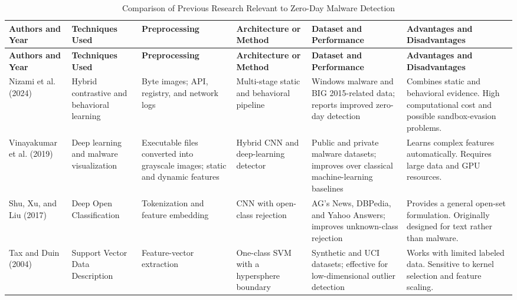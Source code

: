 \documentclass[12pt,a4paper]{article}
\begin{document}
\begin{longtable}{
P{2.2cm}
P{2.7cm}
P{2.7cm}
P{2.8cm}
P{2.7cm}
P{4.0cm}
}

\caption{Comparison of Previous Research Relevant to Zero-Day Malware Detection}
\label{tab:research-comparison}\\

\toprule
\textbf{Authors and Year} &
\textbf{Techniques Used} &
\textbf{Preprocessing} &
\textbf{Architecture or Method} &
\textbf{Dataset and Performance} &
\textbf{Advantages and Disadvantages} \\

\midrule
\endfirsthead

\toprule
\textbf{Authors and Year} &
\textbf{Techniques Used} &
\textbf{Preprocessing} &
\textbf{Architecture or Method} &
\textbf{Dataset and Performance} &
\textbf{Advantages and Disadvantages} \\

\midrule
\endhead

\bottomrule
\endfoot

Nizami et al. (2024) \citep{nizami2024} &
Hybrid contrastive and behavioral learning &
Byte images; API, registry, and network logs &
Multi-stage static and behavioral pipeline &
Windows malware and BIG 2015-related data; reports improved zero-day detection &
Combines static and behavioral evidence. High computational cost and possible sandbox-evasion problems. \\

Vinayakumar et al. (2019) \citep{vinayakumar2019} &
Deep learning and malware visualization &
Executable files converted into grayscale images; static and dynamic features &
Hybrid CNN and deep-learning detector &
Public and private malware datasets; improves over classical machine-learning baselines &
Learns complex features automatically. Requires large data and GPU resources. \\

Shu, Xu, and Liu (2017) \citep{shu2017} &
Deep Open Classification &
Tokenization and feature embedding &
CNN with open-class rejection &
AG's News, DBPedia, and Yahoo Answers; improves unknown-class rejection &
Provides a general open-set formulation. Originally designed for text rather than malware. \\

Tax and Duin (2004) \citep{tax2004} &
Support Vector Data Description &
Feature-vector extraction &
One-class SVM with a hypersphere boundary &
Synthetic and UCI datasets; effective for low-dimensional outlier detection &
Works with limited labeled data. Sensitive to kernel selection and feature scaling. \\


\end{longtable}
\end{document}
